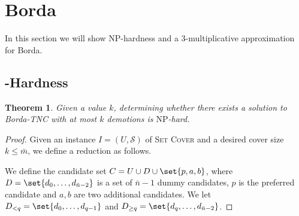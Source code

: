 \documentclass[letterpaper]{article} %
\newtheorem{theorem}{Theorem}
\newcommand{\SC}{\textsc{Set Cover}}
\newcommand{\SB}{\textsc{TNC}}
\newcommand{\NP}{\mathrm{NP}}
\begin{document}
\section{Borda}
In this section we will show $\NP$-hardness and a $3$-multiplicative approximation for Borda.
\subsection{\boldmath{$\NP$}-Hardness}\label{sec:borda_hardness}
\begin{theorem}\label{thr:borda_hardness}
Given a value $k$, determining whether there exists a solution to Borda-\SB{} with at most $k$ demotions  is $\NP$-hard.
\end{theorem}
\begin{proof}
Given an instance $I=(U,\mathcal{S})$ of \SC{} and a desired cover size $k \leq \bar{m}$, we define a reduction as follows.

We define the candidate set $C=U \cup  D \cup \set{p,a,b}$, where $D=\set{d_0,\ldots,d_{\bar{n}-2}}$ is a set of $\bar{n}-1$ dummy candidates, $p$ is the preferred candidate and $a,b$ are  two additional candidates. We let $D_{<q}=\set{d_0,\ldots,d_{q-1}}$ and $D_{\geq q}=\set{d_{q},\ldots,d_{\bar{n}-2}}$.


\end{proof}
\end{document}

